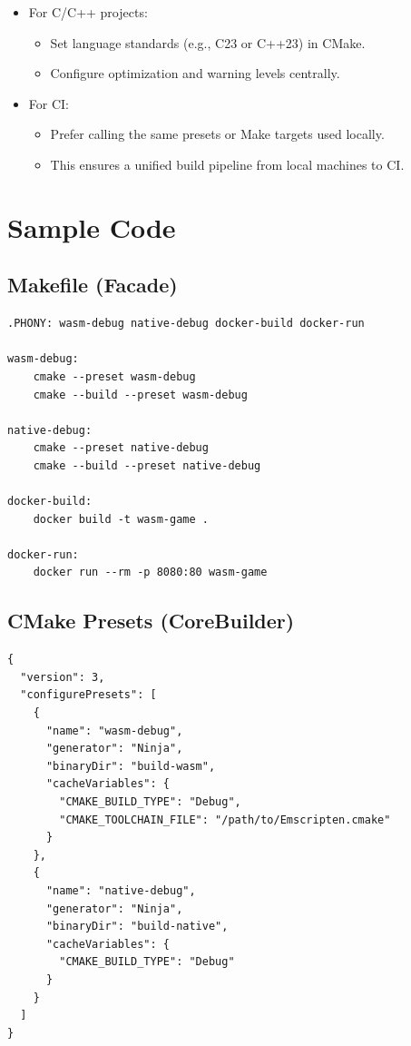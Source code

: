 \documentclass[11pt]{article}
\begin{document}
\begin{itemize}[noitemsep]
  \item For C/C++ projects:
    \begin{itemize}[noitemsep]
      \item Set language standards (e.g., C23 or C++23) in CMake.
      \item Configure optimization and warning levels centrally.
    \end{itemize}
  \item For CI:
    \begin{itemize}[noitemsep]
      \item Prefer calling the same presets or Make targets used locally.
      \item This ensures a unified build pipeline from local machines to CI.
    \end{itemize}
\end{itemize}

\section{Sample Code}

\subsection*{Makefile (Facade)}

\begin{verbatim}
.PHONY: wasm-debug native-debug docker-build docker-run

wasm-debug:
	cmake --preset wasm-debug
	cmake --build --preset wasm-debug

native-debug:
	cmake --preset native-debug
	cmake --build --preset native-debug

docker-build:
	docker build -t wasm-game .

docker-run:
	docker run --rm -p 8080:80 wasm-game
\end{verbatim}

\subsection*{CMake Presets (CoreBuilder)}

\begin{verbatim}
{
  "version": 3,
  "configurePresets": [
    {
      "name": "wasm-debug",
      "generator": "Ninja",
      "binaryDir": "build-wasm",
      "cacheVariables": {
        "CMAKE_BUILD_TYPE": "Debug",
        "CMAKE_TOOLCHAIN_FILE": "/path/to/Emscripten.cmake"
      }
    },
    {
      "name": "native-debug",
      "generator": "Ninja",
      "binaryDir": "build-native",
      "cacheVariables": {
        "CMAKE_BUILD_TYPE": "Debug"
      }
    }
  ]
}
\end{verbatim}
\end{document}

